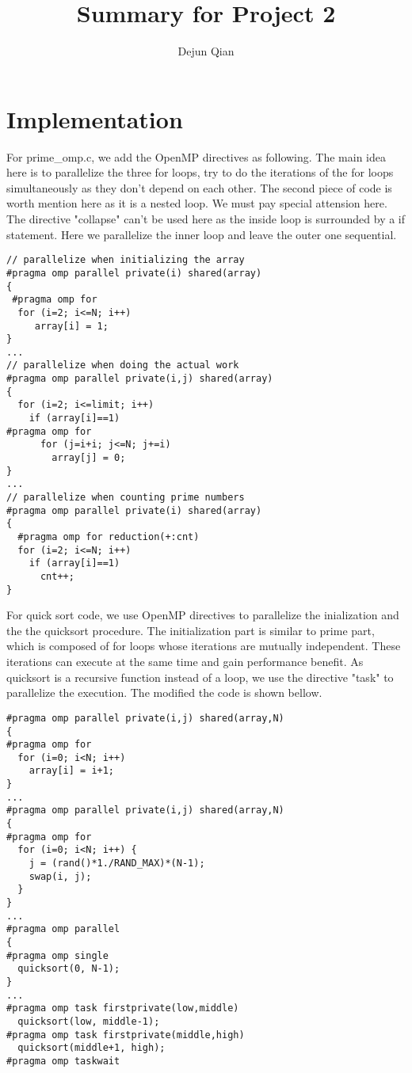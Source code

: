 \documentclass[11pt,letterpaper,oneside]{article}
\title{Summary for Project 2}
\author{Dejun Qian}
\begin{document}
\maketitle

\section{Implementation}
For prime\_omp.c, we add the OpenMP directives as following. The main idea here is to parallelize the three for loops, try to do the iterations of the for loops simultaneously as they don't depend on each other. The second piece of code is worth mention here as it is a nested loop. We must pay special attension here. The directive "collapse" can't be used here as the inside loop is surrounded by a if statement. Here we parallelize the inner loop and leave the outer one sequential.
\begin{Verbatim}[frame=single]
// parallelize when initializing the array
#pragma omp parallel private(i) shared(array)
{
 #pragma omp for
  for (i=2; i<=N; i++)
     array[i] = 1;
}
...
// parallelize when doing the actual work
#pragma omp parallel private(i,j) shared(array)
{
  for (i=2; i<=limit; i++)
    if (array[i]==1)
#pragma omp for
      for (j=i+i; j<=N; j+=i)
        array[j] = 0;
}
...
// parallelize when counting prime numbers
#pragma omp parallel private(i) shared(array)
{
  #pragma omp for reduction(+:cnt)
  for (i=2; i<=N; i++)
    if (array[i]==1)
      cnt++;
}
\end{Verbatim}

For quick sort code, we use OpenMP directives to parallelize the inialization and the the quicksort procedure. The initialization part is similar to prime part, which is composed of for loops whose iterations are mutually independent. These iterations can execute at the same time and gain performance benefit. As quicksort is a recursive function instead of a loop, we use the directive "task" to parallelize the execution. The modified the code is shown bellow.
\begin{Verbatim}[frame=single]
#pragma omp parallel private(i,j) shared(array,N)
{
#pragma omp for
  for (i=0; i<N; i++)
    array[i] = i+1;
}
...
#pragma omp parallel private(i,j) shared(array,N)
{
#pragma omp for
  for (i=0; i<N; i++) {
    j = (rand()*1./RAND_MAX)*(N-1);
    swap(i, j);
  }
}
...
#pragma omp parallel
{
#pragma omp single
  quicksort(0, N-1);
}
...
#pragma omp task firstprivate(low,middle)
  quicksort(low, middle-1);
#pragma omp task firstprivate(middle,high)
  quicksort(middle+1, high);
#pragma omp taskwait
\end{Verbatim}
\end{document}
